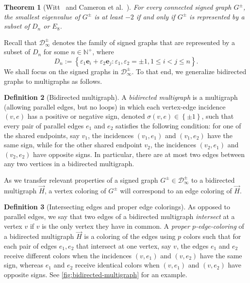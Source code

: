 \documentclass[11pt]{article}
\newtheorem{theorem}{Theorem}[section]
\theoremstyle{definition}
\newtheorem{definition}[theorem]{Definition}
\theoremstyle{remark}
\newcommand{\dset}[2]{\left\{{#1}\colon{#2}\right\}}
\newcommand{\sset}[1]{\left\{{#1}\right\}}
\newcommand{\eps}{\varepsilon}
\newcommand{\D}{\mathcal{D}}
\newcommand{\N}{\mathbb{N}}
\begin{document}
\begin{theorem}[Witt~\cite{W41} and Cameron et al.~\cite{CGSS76}] \label{thm:cgss-signed}
    For every connected signed graph $G^\pm$, the smallest eigenvalue of $G^\pm$ is at least $-2$ if and only if $G^\pm$ is represented by a subset of $D_n$ or $E_8$.
\end{theorem}

Recall that $\D_\infty^\pm$ denotes the family of signed graphs that are represented by a subset of $D_n$ for some $n \in \N^+$, where
\[
    D_n := \dset{\eps_1 \bm{e}_i + \eps_2 \bm{e}_j}{\eps_1, \eps_2 = \pm 1, 1 \le i < j \le n}.
\]
We shall focus on the signed graphs in $\D_\infty^\pm$. To that end, we generalize bidirected graphs to multigraphs as follows.

\begin{definition}[Bidirected multigraph]
    A \emph{bidirected multigraph} is a multigraph (allowing parallel edges, but no loops) in which each vertex-edge incidence $(v, e)$ has a positive or negative sign, denoted $\sigma(v, e) \in \sset{\pm 1}$, such that every pair of parallel edges $e_1$ and $e_2$ satisfies the following condition: for one of the shared endpoints, say $v_1$, the incidences $(v_1, e_1)$ and $(v_1, e_2)$ have the same sign, while for the other shared endpoint $v_2$, the incidences $(v_2, e_1)$ and $(v_2, e_2)$ have opposite signs. In particular, there are at most two edges between any two vertices in a bidirected multigraph.
\end{definition}

As we transfer relevant properties of a signed graph $G^\pm \in \D_\infty^\pm$ to a bidirected multigraph $\vec{H}$, a vertex coloring of $G^\pm$ will correspond to an edge coloring of $\vec{H}$.

\begin{definition}[Intersecting edges and proper edge colorings] \label{def:proper-edge-coloring}
    As opposed to parallel edges, we say that two edges of a bidirected multigraph \emph{intersect} at a vertex $v$ if $v$ is the only vertex they have in common. A \emph{proper $p$-edge-coloring} of a bidirected multigraph $\vec{H}$ is a coloring of the edges using $p$ colors such that for each pair of edges $e_1, e_2$ that intersect at one vertex, say $v$, the edges $e_1$ and $e_2$ receive different colors when the incidences $(v, e_1)$ and $(v, e_2)$ have the same sign, whereas $e_1$ and $e_2$ receive identical colors when $(v, e_1)$ and $(v, e_2)$ have opposite signs. See \cref{fig:bidirected-multigraph} for an example.
\end{definition}
\end{document}
